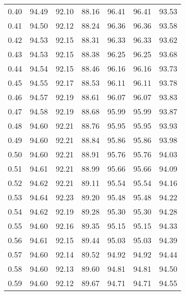 \begin{tabular}{|c|c|c|c|c|c|c|}
      0.40 &     94.49 &     92.10 &      88.16 &   96.41 &      96.41 &         93.53 \\
      0.41 &     94.50 &     92.12 &      88.24 &   96.36 &      96.36 &         93.58 \\
      0.42 &     94.53 &     92.15 &      88.31 &   96.33 &      96.33 &         93.62 \\
      0.43 &     94.53 &     92.15 &      88.38 &   96.25 &      96.25 &         93.68 \\
      0.44 &     94.54 &     92.15 &      88.46 &   96.16 &      96.16 &         93.73 \\
      0.45 &     94.55 &     92.17 &      88.53 &   96.11 &      96.11 &         93.78 \\
      0.46 &     94.57 &     92.19 &      88.61 &   96.07 &      96.07 &         93.83 \\
      0.47 &     94.58 &     92.19 &      88.68 &   95.99 &      95.99 &         93.87 \\
      0.48 &     94.60 &     92.21 &      88.76 &   95.95 &      95.95 &         93.93 \\
      0.49 &     94.60 &     92.21 &      88.84 &   95.86 &      95.86 &         93.98 \\
      0.50 &     94.60 &     92.21 &      88.91 &   95.76 &      95.76 &         94.03 \\
      0.51 &     94.61 &     92.21 &      88.99 &   95.66 &      95.66 &         94.09 \\
      0.52 &     94.62 &     92.21 &      89.11 &   95.54 &      95.54 &         94.16 \\
      0.53 &     94.64 &     92.23 &      89.20 &   95.48 &      95.48 &         94.22 \\
      0.54 &     94.62 &     92.19 &      89.28 &   95.30 &      95.30 &         94.28 \\
      0.55 &     94.60 &     92.16 &      89.35 &   95.15 &      95.15 &         94.33 \\
      0.56 &     94.61 &     92.15 &      89.44 &   95.03 &      95.03 &         94.39 \\
      0.57 &     94.60 &     92.14 &      89.52 &   94.92 &      94.92 &         94.44 \\
      0.58 &     94.60 &     92.13 &      89.60 &   94.81 &      94.81 &         94.50 \\
      0.59 &     94.60 &     92.12 &      89.67 &   94.71 &      94.71 &         94.55 \\

\end{tabular}
